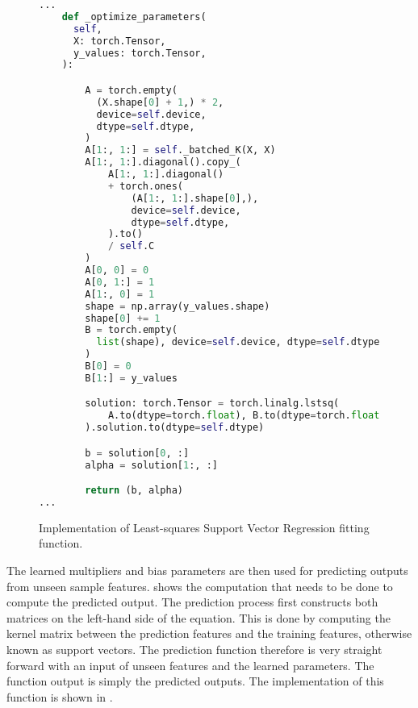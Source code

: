 \begin{figure}[H]
  \centering
  \begin{lstlisting}[language=Python]
...
    def _optimize_parameters(
      self,
      X: torch.Tensor,
      y_values: torch.Tensor,
    ):

        A = torch.empty(
          (X.shape[0] + 1,) * 2,
          device=self.device,
          dtype=self.dtype,
        )
        A[1:, 1:] = self._batched_K(X, X)
        A[1:, 1:].diagonal().copy_(
            A[1:, 1:].diagonal()
            + torch.ones(
                (A[1:, 1:].shape[0],),
                device=self.device,
                dtype=self.dtype,
            ).to()
            / self.C
        )
        A[0, 0] = 0
        A[0, 1:] = 1
        A[1:, 0] = 1
        shape = np.array(y_values.shape)
        shape[0] += 1
        B = torch.empty(
          list(shape), device=self.device, dtype=self.dtype
        )
        B[0] = 0
        B[1:] = y_values

        solution: torch.Tensor = torch.linalg.lstsq(
            A.to(dtype=torch.float), B.to(dtype=torch.float)
        ).solution.to(dtype=self.dtype)

        b = solution[0, :]
        alpha = solution[1:, :]

        return (b, alpha)
...
  \end{lstlisting}
  \caption{Implementation of Least-squares Support Vector Regression fitting function.}\label{fig:lssvr_fit_function_impl}
\end{figure}

The learned multipliers and bias parameters are then used for predicting outputs from unseen sample features.  shows the computation that needs to be done to compute the predicted output. The prediction process first constructs both matrices on the left-hand side of the equation. This is done by computing the kernel matrix between the prediction features and the training features, otherwise known as support vectors. The prediction function therefore is very straight forward with an input of unseen features and the learned parameters. The function output is simply the predicted outputs. The implementation of this function is shown in .

